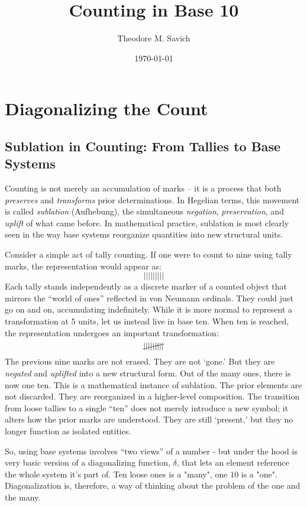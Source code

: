 \documentclass[11pt]{article}
\title{Counting in Base 10}
\author{Theodore M. Savich}
\date{\today}
\begin{document}
\maketitle


\section{Diagonalizing the Count}\label{sec:diagonalizing_the_count}
\subsection{Sublation in Counting: From Tallies to Base Systems}\label{sublation-in-counting-from-tallies-to-base-systems}

Counting is not merely an accumulation of marks -- it is a process that both \textit{preserves} and \textit{transforms} prior determinations. In Hegelian terms, this movement is called \textit{sublation} (Aufhebung), the simultaneous \textit{negation}, \textit{preservation}, and \textit{uplift} of what came before. In mathematical practice, sublation is most clearly seen in the way base systems reorganize quantities into new structural units.

Consider a simple act of tally counting. If one were to count to nine using tally marks, the representation would appear as: 
\[
\vert\vert\vert\vert\vert\vert\vert\vert\vert
\]
Each tally stands independently as a discrete marker of a counted object that mirrors the ``world of ones'' reflected in von Neumann ordinals. They could just go on and on, accumulating indefinitely. While it is more normal to represent a transformation at 5 units, let us instead live in base ten. When ten is reached, the representation undergoes an important transformation:
\[
\cancel{\vert\vert\vert\vert\vert\vert\vert\vert\vert}
\]
The previous nine marks are not erased. They are not `gone.' But they are \textit{negated} and \textit{uplifted} into a new structural form. Out of the many ones, there is now one ten. This is a mathematical instance of sublation. The prior elements are not discarded. They are reorganized in a higher-level composition. The transition from loose tallies to a single ``ten'' does not merely introduce a new symbol; it alters how the prior marks are understood. They are still `present,' but they no longer function as isolated entities. 

So, using base systems involves ``two views'' of a number - but under the hood is very basic version of a diagonalizing function, $\delta$, that lets an element reference the whole system it’s part of. Ten loose ones is a "many", one 10 is a "one". Diagonalization is, therefore, a way of thinking about the problem of the one and the many. 
\end{document}
